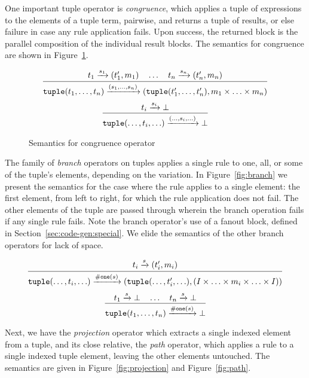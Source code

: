 
One important tuple operator is \emph{congruence}, which applies a tuple of expressions to the elements of a tuple term, pairwise, and returns a tuple of results, or else failure in case any rule application fails. Upon success, the returned block is the parallel composition of the individual result blocks. The semantics for congruence are shown in Figure~\ref{fig:congruence}.

\begin{figure}[ht]
\[
\infer
  {\mathtt{tuple}(t_1,\ldots,t_n)\arr{(s_1,\ldots,s_n)} (\mathtt{tuple}(t_1',\ldots,t_n'),m_1 \times \ldots \times m_n)}
  {t_1 \arr{s_1} (t_1',m_1) \quad \ldots \quad t_n \arr{s_n} (t_n',m_n)}
\]
\[
\infer
  {\mathtt{tuple}(\ldots,t_i,\ldots)\arr{(\ldots,s_i,\ldots)}\bot}
  {t_i \arr{s_i} \bot}
\]
\caption{Semantics for congruence operator}
\label{fig:congruence}
\end{figure}

The family of \emph{branch} operators on tuples applies a single rule to one, all, or some of the tuple's elements, depending on the variation. In Figure~\ref{fig:branch} we present the semantics for the case where the rule applies to a single element: the first element, from left to right, for which the rule application does not fail. The other elements of the tuple are passed through wherein the branch operation fails if any single rule fails. Note the branch operator's use of a fanout block, defined in Section~\ref{sec:code-gen:special}. We elide the semantics of the other branch operators for lack of space.

\begin{figure*}[ht]
\[
\infer
  {\mathtt{tuple}(\ldots,t_i,\ldots) \arr{\mathtt{\#one}(s)} (\mathtt{tuple}(\ldots,t_i',\ldots),(I \times \ldots \times m_i \times \ldots \times I))}
  {t_i \arr{s} (t_i',m_i)}
\]
\[
\infer
  {\mathtt{tuple}(t_1,\ldots,t_n) \arr{\mathtt{\#one}(s)} \bot}
  {t_1 \arr{s} \bot \quad \ldots \quad t_n \arr{s} \bot}
\]
\caption{Semantics for branch-one operator}
\label{fig:branch}
\end{figure*}

Next, we have the \emph{projection} operator which extracts a single indexed element from a tuple, and its close relative, the \emph{path} operator, which applies a rule to a single indexed tuple element, leaving the other elements untouched. The semantics are given in Figure~\ref{fig:projection} and Figure~\ref{fig:path}.

